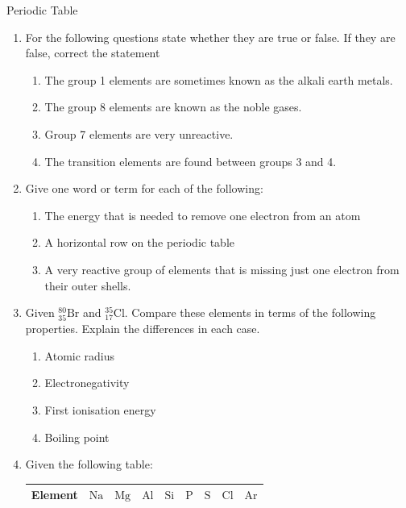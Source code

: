 \begin{eocexercises}{ Periodic Table}
            \nopagebreak \noindent
\label{m38757*uid091221}\begin{enumerate}[noitemsep, label=\textbf{\arabic*}. ] 
\item For the following questions state whether they are true or false. If they are false, correct the statement
  \label{m38757*id073324}\begin{enumerate}[noitemsep, label=\textbf{\alph*}. ] 
  \item The group 1 elements are sometimes known as the alkali earth metals.
  \item The group 8 elements are known as the noble gases.
  \item Group 7 elements are very unreactive.
  \item The transition elements are found between groups 3 and 4.\end{enumerate}
\item Give one word or term for each of the following:
   \label{m38757*id0734}\begin{enumerate}[noitemsep, label=\textbf{\alph*}. ] 
   \item The energy that is needed to remove one electron from an atom
   \item A horizontal row on the periodic table
   \item A very reactive group of elements that is missing just one electron from their outer shells.
   \end{enumerate}
\item Given $^{80}_{35}\text{Br}$ and $^{35}_{17}\text{Cl}$. Compare these elements in terms of the following properties. Explain the differences in each case.
  \begin{enumerate}[noitemsep, label=\textbf{\alph*}. ]
   \item Atomic radius
   \item Electronegativity
   \item First ionisation energy
   \item Boiling point
  \end{enumerate}
\item Given the following table:
  \begin{table}[H]
   \begin{center}
    \begin{tabular}{|l|l|l|l|l|l|l|l|l|} \hline
     \textbf{Element} & $\text{Na}$ & $\text{Mg}$ & $\text{Al}$ & $\text{Si}$ & $\text{P}$ & $\text{S}$ & $\text{Cl}$ & $\text{Ar}$ \\ \hline

\end{tabular}
\end{center}
\end{table}
\end{enumerate}
\end{eocexercises}
